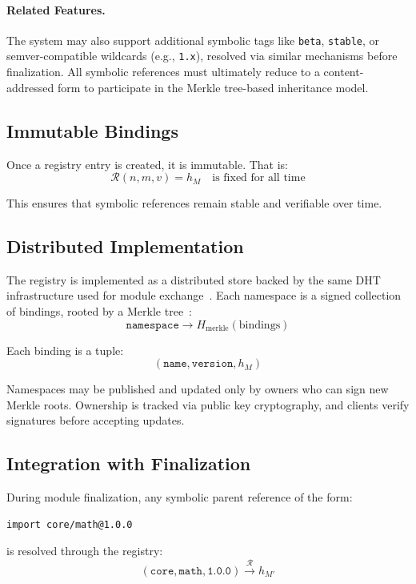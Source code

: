 \documentclass[sigplan,screen]{acmart}
\begin{document}
\paragraph{Related Features.}
The system may also support additional symbolic tags like \texttt{beta}, \texttt{stable}, or semver-compatible wildcards (e.g., \texttt{1.x}), resolved via similar mechanisms before finalization. All symbolic references must ultimately reduce to a content-addressed form to participate in the Merkle tree-based inheritance model.

\subsection{Immutable Bindings}

Once a registry entry is created, it is immutable. That is:
\[
\mathcal{R}(n, m, v) = h_M \quad \text{is fixed for all time}
\]

This ensures that symbolic references remain stable and verifiable over time.

\subsection{Distributed Implementation}

The registry is implemented as a distributed store backed by the same DHT infrastructure used for module exchange~\cite{dht}. Each namespace is a signed collection of bindings, rooted by a Merkle tree~\cite{merkle1978}:
\[
\texttt{namespace} \rightarrow H_{\text{merkle}}(\text{bindings})
\]

Each binding is a tuple:
\[
(\texttt{name}, \texttt{version}, h_M)
\]

Namespaces may be published and updated only by owners who can sign new Merkle roots. Ownership is tracked via public key cryptography, and clients verify signatures before accepting updates.

\subsection{Integration with Finalization}

During module finalization, any symbolic parent reference of the form:
\begin{verbatim}
import core/math@1.0.0
\end{verbatim}
is resolved through the registry:
\[
(\texttt{core}, \texttt{math}, \texttt{1.0.0}) \xrightarrow{\mathcal{R}} h_{M'}
\]
\end{document}
